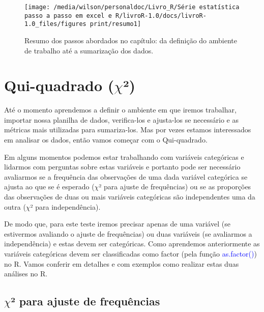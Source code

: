 \documentclass[titlepage, oneside, openany, a4paper]{book}
\begin{document}
\begin{figure}

{\centering \texttt{[image: /media/wilson/personaldoc/Livro\_R/Série estatística passo a passo em excel e R/livroR-1.0/docs/livroR-1.0\_files/figures print/resumo1]} 

}

\caption{Resumo dos passos abordados no capítulo: da definição do ambiente de trabalho até a sumarização dos dados.}\label{fig:resumo1}
\end{figure}

\hypertarget{qui-quadrado-chi}{%
\chapter{\texorpdfstring{Qui-quadrado (\(\chi\)²)}{Qui-quadrado (\textbackslash{}chi²)}}\label{qui-quadrado-chi}}

Até o momento aprendemos a definir o ambiente em que iremos trabalhar, importar nossa planilha de dados, verifica-los e ajusta-los se necessário e as métricas mais utilizadas para sumariza-los. Mas por vezes estamos interessados em analisar os dados, então vamos começar com o Qui-quadrado.

Em alguns momentos podemos estar trabalhando com variáveis categóricas e lidarmos com perguntas sobre estas variáveis e portanto pode ser necessário avaliarmos se a frequência das observações de uma dada variável categórica se ajusta ao que se é esperado (\(\chi\)² para ajuste de frequências) ou se as proporções das observações de duas ou mais variáveis categóricas são independentes uma da outra (\(\chi\)² para independência).

De modo que, para este teste iremos precisar apenas de uma variável (se estivermos avaliando o ajuste de frequências) ou duas variáveis (se avaliarmos a independência) e estas devem ser categóricas. Como aprendemos anteriormente as variáveis categóricas devem ser classificadas como factor (pela função \textcolor{blue}{as.factor()}) no R. Vamos conferir em detalhes e com exemplos como realizar estas duas análises no R.

\hypertarget{chi-para-ajuste-de-frequuxeancias}{%
\section{\texorpdfstring{\(\chi\)² para ajuste de frequências}{\textbackslash{}chi² para ajuste de frequências}}\label{chi-para-ajuste-de-frequuxeancias}}
\end{document}
